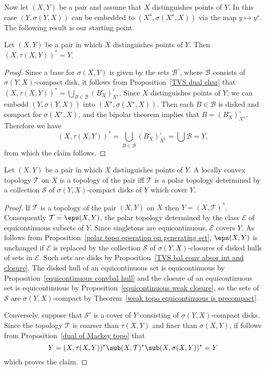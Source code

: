 Now let $(X,Y)$ be a pair and assume that $X$ distinguishes points of $Y$. In this case $(Y,\sigma(Y,X))$ can be embedded to $(X^{\star},\sigma(X^{\star},X))$ via the map $y\mapsto y^{\star}$. The following result is our starting point. 
\begin{proposition}\label{dual of Mackey topo}
Let $(X,Y)$ be a pair in which $X$ distinguishes points of $Y$. Then $(X,\tau(X,Y))^*=Y$.
\end{proposition}
\begin{proof}
Since a base for $\sigma(X,Y)$ is given by the sets $\mathcal{B}^\circ$, where $\mathcal{B}$ consists of $\sigma(Y,X)$-compact disk, it follows from Proposition~\ref{TVS dual char} that $(X,\tau(X,Y))^*=\bigcup_{B\in\mathcal{B}}(B^\circ_{X})^\circ_{X^{\star}}$. Since $X$ distinguishes points of $Y$, we can embedd $(Y,\sigma(Y,X))$ into $(X^{\star},\sigma(X^{\star},X))$. Then each $B\in\mathcal{B}$ is disked and compact for $\sigma(X^{\star},X)$, and the bipolar theorem implies that $B=(B^{\circ}_X)^{\circ}_{X^{\star}}$. Therefore we have
\[(X,\tau(X,Y))^*=\bigcup_{B\in\mathcal{B}}(B^\circ_{X})^\circ_{X^{\star}}=\bigcup\mathcal{B}=Y,\]
from which the claim follows.
\end{proof}
\begin{theorem}\label{dual topo char}
Let $(X,Y)$ be a pair in which $X$ distinguishes points of $Y$. A locally convex topology $\mathcal{T}$ on $X$ is a topology of the pair iff $\mathcal{T}$ is a polar topology determined by a collection $\mathcal{S}$ of $\sigma(Y,X)$-compact disks of $Y$ which cover $Y$.
\end{theorem}
\begin{proof}
If $\mathcal{T}$ is a topology of the pair $(X,Y)$ on $X$ then $Y=(X,\mathcal{T})^*$. Consequently $\mathcal{T}=\eps(X,Y)$, the polar topology determined by the class $\mathcal{E}$ of equicontinuous subsets of $Y$. Since singletons are equicontinuous, $\mathcal{E}$ covers $Y$. As follows from Proposition~\ref{polar topo operation on generating set}, $\eps(X,Y)$ is unchanged if $\mathcal{E}$ is replaced by the collection $\mathcal{S}$ of $\sigma(Y,X)$-closures of disked hulls of sets in $\mathcal{E}$. Such sets are disks by Proposition~\ref{TVS bal conv absor int and closure}. The disked hull of an equicontinuous set is equicontinuous by Proposition~\ref{equicontinuous convbal hull} and the closure of an equicontinuous set is equicontinuous by Proposition~\ref{equicontinuous weak closure}, so the sets of $\mathcal{S}$ are $\sigma(Y,X)$-compact by Theorem~\ref{weak topo equicontinuous is precompact}.\par
Conversely, suppose that $\mathcal{S}'$ is a cover of $Y$ consisting of $\sigma(Y,X)$-compact disks. Since the topology $\mathcal{T}$ is coarser than $\tau(X,Y)$ and finer than $\sigma(X,Y)$, if follows from Proposition~\ref{dual of Mackey topo} that
\[Y=(X,\tau(X,Y))^*\sub(X,\mathcal{T})^*\sub (X,\sigma(X,Y))^*=Y\]
which proves the claim.
\end{proof}
